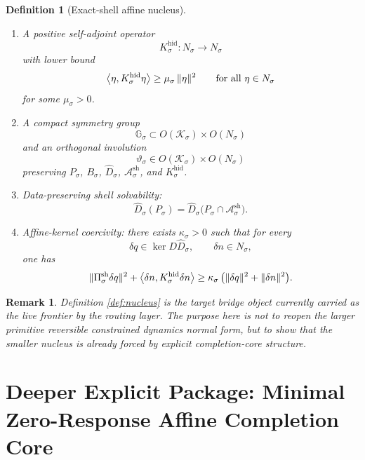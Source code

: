 \documentclass[11pt]{article}
\newcommand{\ForSpace}[1]{\mathcal I_{#1}^{\mathrm{for}}}
\newcommand{\HiddenOperator}[1]{K_{#1}^{\mathrm{hid}}}
\newcommand{\CoordSpace}[1]{\mathcal K_{#1}}
\newcommand{\CoordBody}[1]{P_{#1}}
\newcommand{\NormalSpace}[1]{N_{#1}}
\newcommand{\NormalBody}[1]{B_{#1}}
\newcommand{\AffineData}[1]{\widehat D_{#1}}
\newcommand{\ShellAffine}[1]{\mathcal A_{#1}^{\mathrm{sh}}}
\newcommand{\ShellProj}[1]{\Pi_{#1}^{\mathrm{sh}}}
\newcommand{\SymGroup}[1]{\mathbb G_{#1}}
\newcommand{\TimeRev}[1]{\vartheta_{#1}}
\newtheorem{definition}{Definition}
\newtheorem{remark}{Remark}
\begin{document}
\begin{definition}[Exact-shell affine nucleus]
\begin{enumerate}
    for every \(w\in\ForSpace{\sigma}\).
    \item A positive self-adjoint operator
    \[
    \HiddenOperator{\sigma}:\NormalSpace{\sigma}\to\NormalSpace{\sigma}
    \]
    with lower bound
    \begin{equation}
    \ev{\eta,\HiddenOperator{\sigma}\eta}
    \ge
    \mu_{\sigma}\,\|\eta\|^{2}
    \qquad
    \text{for all }\eta\in\NormalSpace{\sigma}
    \label{eq:nucleusgap}
    \end{equation}
    for some \(\mu_{\sigma}>0\).
    \item A compact symmetry group
    \[
    \SymGroup{\sigma}\subset O(\CoordSpace{\sigma})\times O(\NormalSpace{\sigma})
    \]
    and an orthogonal involution
    \[
    \TimeRev{\sigma}\in O(\CoordSpace{\sigma})\times O(\NormalSpace{\sigma})
    \]
    preserving \(\CoordBody{\sigma}\), \(\NormalBody{\sigma}\), \(\AffineData{\sigma}\), \(\ShellAffine{\sigma}\), and \(\HiddenOperator{\sigma}\).
    \item Data-preserving shell solvability:
    \begin{equation}
    \AffineData{\sigma}(\CoordBody{\sigma})
    =
    \AffineData{\sigma}
    \bigl(
    \CoordBody{\sigma}\cap\ShellAffine{\sigma}
    \bigr).
    \label{eq:nucleussolvability}
    \end{equation}
    \item Affine-kernel coercivity: there exists \(\kappa_{\sigma}>0\) such that for every
    \[
    \delta q\in \ker D\AffineData{\sigma},
    \qquad
    \delta n\in \NormalSpace{\sigma},
    \]
    one has
    \begin{equation}
    \|\ShellProj{\sigma}\delta q\|^{2}
    +
    \ev{\delta n,\HiddenOperator{\sigma}\delta n}
    \ge
    \kappa_{\sigma}\,
    \bigl(
    \|\delta q\|^{2}+\|\delta n\|^{2}
    \bigr).
    \label{eq:nucleuscoercive}
    \end{equation}
\end{enumerate}
\end{definition}

\begin{remark}
Definition \ref{def:nucleus} is the target bridge object currently carried as the live frontier by the routing layer. The purpose here is not to reopen the larger primitive reversible constrained dynamics normal form, but to show that the smaller nucleus is already forced by explicit completion-core structure.
\end{remark}

\section{Deeper Explicit Package: Minimal Zero-Response Affine Completion Core}
\end{document}
